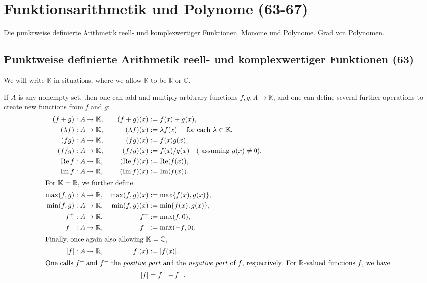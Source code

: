 \section{Funktionsarithmetik und Polynome (63-67)}
 
Die punktweise definierte Arithmetik reell- und komplexwertiger Funktionen. Monome und Polynome. Grad von Polynomen. 

\subsection{Punktweise definierte Arithmetik reell- und komplexwertiger Funktionen (63)}
We will write $\mathbb { K }$ in situations, where we allow $\mathbb { K }$ to be $\mathbb { R }$ or $\mathbb { C }$.

If $A$ is any nonempty set, then one can add and multiply arbitrary
functions $f ,g : A \rightarrow \mathbb { K }$, and one can define several further operations to create new functions from $f$ and $g$:
\begin{align}
( f + g ) &: A \rightarrow \mathbb { K } , &  ( f + g ) ( x ) &: = f ( x ) + g ( x ), \\
( \lambda f ) &: A \rightarrow \mathbb { K } , &  ( \lambda f ) ( x ) &: = \lambda f ( x ) \quad \text{ for each } \lambda \in \mathbb { K },\\
( f g ) &: A \rightarrow \mathbb { K } , &  ( f g ) ( x ) &: = f ( x ) g ( x ),\\
( f / g ) &: A \rightarrow \mathbb { K } , &  ( f / g ) ( x ) &: = f ( x ) / g ( x ) \quad ( \text{ assuming } g ( x ) \neq 0),\\
\operatorname{Re} f &: A \rightarrow \mathbb { R } , &  ( \operatorname{Re} f ) ( x ) &: = \operatorname{Re} ( f ( x ) ),\\
\operatorname{Im} f &: A \rightarrow \mathbb { R } , &  ( \operatorname{Im} f ) ( x ) &: = \operatorname{Im} ( f ( x ) ).\\
\intertext{For $\mathbb { K } = \mathbb{R}$, we further define}
\max ( f ,g ) &: A \rightarrow \mathbb { R } , & \max ( f ,g ) ( x ) &: = \max \{ f ( x ) ,g ( x ) \}, \\
\min ( f ,g ) &: A \rightarrow \mathbb { R } , & \min ( f ,g ) ( x ) &: = \min \{ f ( x ) ,g ( x ) \},\\
f ^ { + } &: A \rightarrow \mathbb { R } , & f ^ { + } &: = \max ( f ,0),\\
f ^ { - } &: A \rightarrow \mathbb { R } , & f ^ { - } &: = \max ( - f ,0).\\
\intertext{Finally, once again also allowing $\mathbb{K}=\mathbb{C}$,}
| f | &: A \rightarrow \mathbb { R } , & | f | ( x ) &: = | f ( x ) |.\\
\intertext{One calls $f ^ { + }$ and $f ^ { - }$ the \textit{positive part} and the \textit{negative part} of $f$, respectively. For $\mathbb{R}$-valued functions $f$, we have}
&& | f | &= f ^ { + } + f ^ { - }.
\end{align}


